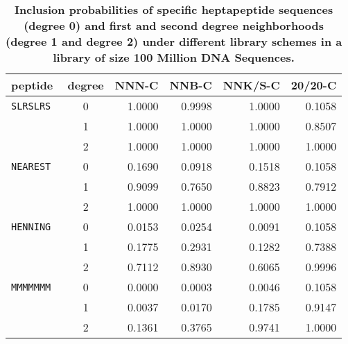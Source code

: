 \begin{table}[!ht]
\captionsetup{labelformat=supp}
\centering
\caption{\bf Inclusion probabilities of specific heptapeptide sequences (degree 0) and  first and second degree neighborhoods (degree 1 and degree 2) under different library schemes in a library of size 100 Million DNA Sequences. } 
\begin{tabular}{|l|c|r|r|r|r|}
  \hline
\bf peptide & \bf degree & \bf NNN-C & \bf NNB-C & \bf NNK/S-C & \bf 20/20-C \\ 
  \hline
\tt SLRSLRS &     0 & 1.0000 & 0.9998 & 1.0000 & 0.1058 \\ \cline{2-6}
   &     1 & 1.0000 & 1.0000 & 1.0000 & 0.8507 \\ \cline{2-6}
   &     2 & 1.0000 & 1.0000 & 1.0000 & 1.0000 \\ \hline
\tt NEAREST &     0 & 0.1690 & 0.0918 & 0.1518 & 0.1058 \\ \cline{2-6}
   &     1 & 0.9099 & 0.7650 & 0.8823 & 0.7912 \\ \cline{2-6}
   &     2 & 1.0000 & 1.0000 & 1.0000 & 1.0000 \\ \hline
\tt HENNING &     0 & 0.0153 & 0.0254 & 0.0091 & 0.1058 \\ \cline{2-6}
   &     1 & 0.1775 & 0.2931 & 0.1282 & 0.7388 \\ \cline{2-6}
   &     2 & 0.7112 & 0.8930 & 0.6065 & 0.9996 \\ \hline
\tt MMMMMMM &     0 & 0.0000 & 0.0003 & 0.0046 & 0.1058 \\ \cline{2-6}
   &     1 & 0.0037 & 0.0170 & 0.1785 & 0.9147 \\ \cline{2-6}
   &     2 & 0.1361 & 0.3765 & 0.9741 & 1.0000 \\ 
   \hline
\end{tabular}
\end{table}